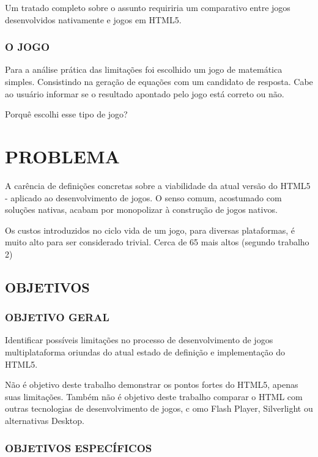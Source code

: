 \documentclass[
12pt,
a4paper,
portuges,
draft
]{report}
\begin{document}
Um tratado completo sobre o assunto requiriria um comparativo entre
jogos desenvolvidos nativamente e jogos em HTML5.

\subsection{O JOGO}

Para a análise prática das limitações foi escolhido um jogo de
matemática simples. Consistindo na geração de equações com um
candidato de resposta. Cabe ao usuário informar se o resultado apontado
pelo jogo está correto ou não.

Porquê escolhi esse tipo de jogo?

\chapter{PROBLEMA}

A carência de definições concretas sobre a viabilidade da atual
versão do HTML5 - aplicado ao desenvolvimento de jogos. O senso comum, 
acostumado com soluções nativas, acabam por monopolizar à construção de jogos nativos.

Os custos introduzidos no ciclo vida de um jogo, para diversas
plataformas, é muito alto para ser considerado trivial. Cerca de 65%
mais altos (segundo trabalho 2)

\section{OBJETIVOS}

\subsection{OBJETIVO GERAL}

Identificar possíveis limitações no processo de desenvolvimento
de jogos multiplataforma oriundas do atual estado de definição e
implementação do HTML5.

Não é objetivo deste trabalho demonstrar os pontos fortes do HTML5,
apenas suas limitações. Também não é objetivo deste trabalho
comparar o HTML com outras tecnologias de desenvolvimento de jogos, c
omo Flash Player, Silverlight ou alternativas Desktop.

\subsection{OBJETIVOS ESPECÍFICOS}
\end{document}
